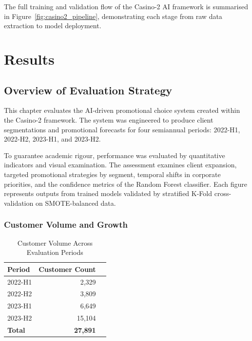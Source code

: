 \documentclass[12pt,a4paper]{report}
\begin{document}
The full training and validation flow of the Casino-2 AI framework is summarised in Figure~\ref{fig:casino2_pipeline}, demonstrating each stage from raw data extraction to model deployment.


\chapter{Results}
\label{sec:results}

\section{Overview of Evaluation Strategy}

This chapter evaluates the AI-driven promotional choice system created within the Casino-2 framework.  The system was engineered to produce client segmentations and promotional forecasts for four semiannual periods: 2022-H1, 2022-H2, 2023-H1, and 2023-H2.

To guarantee academic rigour, performance was evaluated by quantitative indicators and visual examination.  The assessment examines client expansion, targeted promotional strategies by segment, temporal shifts in corporate priorities, and the confidence metrics of the Random Forest classifier.  Each figure represents outputs from trained models validated by stratified K-Fold cross-validation on SMOTE-balanced data.

\subsection{Customer Volume and Growth}
\label{sec:customer_growth}

\begin{table}[H]
\centering
\caption{Customer Volume Across Evaluation Periods}
\label{tab:customer_count_by_period}
\begin{tabular}{lrr}
\toprule
\textbf{Period} & \textbf{Customer Count} \\
\midrule
2022-H1 & 2,329 \\
2022-H2 & 3,809 \\
2023-H1 & 6,649 \\
2023-H2 & 15,104 \\
\midrule
\textbf{Total} & \textbf{27,891} \\
\bottomrule
\end{tabular}
\end{table}
\end{document}
